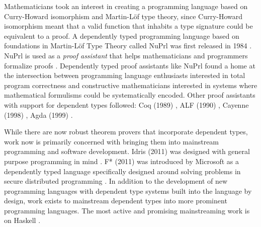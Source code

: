 Mathematicians took an interest in creating a programming language based on
Curry-Howard isomorphism and Martin-L\"{o}f type theory, since Curry-Howard
isomorphism meant that a valid function that inhabits a type signature could be
equivalent to a proof. A dependently typed programming language based on
foundations in Martin-L\"{o}f Type Theory called NuPrl was first released in
1984 \cite{nuprl}. NuPrl is used as a \textit{proof assistant} that helps
mathematicians and programmers formalize proofs \cite{nuprl}. Dependently typed
proof assistants like NuPrl found a home at the intersection between programming
language enthusiasts interested in total program correctness and constructive
mathematicians interested in systems where mathematical formulisms could be
systematically encoded. Other proof assistants with support for dependent types
followed: Coq (1989) \cite{coquand1988calculus}, ALF (1990) \cite{alf}, Cayenne
(1998) \cite{nuprl}, Agda (1999) \cite{norell:thesis}.

While there are now robust theorem provers that incorporate dependent types,
work now is primarily concerned with bringing them into mainstream programming
and software development. Idris (2011) was designed with general purpose
programming in mind \cite{tdd_book}. F* (2011) was introduced by Microsoft as a
dependently typed language specifically designed around solving problems in
secure distributed programming \cite{fstar_distributed_programming}. In addition
to the development of new programming languages with dependent type systems
built into the language by design, work exists to mainstream dependent types
into more prominent programming languages. The most active and promising
mainstreaming work is on Haskell \cite{eisenberg2016,gundry2013}. 